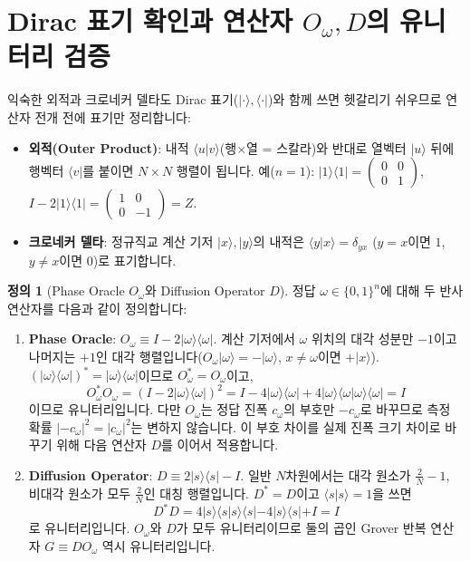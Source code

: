 \documentclass[11pt, a4paper]{article}
\newcommand{\ket}[1]{|#1\rangle}
\newcommand{\bra}[1]{\langle#1|}
\newcommand{\braket}[2]{\langle#1|#2\rangle}
\theoremstyle{definition}
\newtheorem{definition}{정의}[section]
\begin{document}
\section{Dirac 표기 확인과 연산자 \texorpdfstring{$O_\omega, D$}{O, D}의 유니터리 검증}
익숙한 외적과 크로네커 델타도 Dirac 표기($\ket{\cdot}, \bra{\cdot}$)와 함께 쓰면 헷갈리기 쉬우므로 연산자 전개 전에 표기만 정리합니다:
\begin{itemize}
    \item \textbf{외적(Outer Product)}: 내적 $\braket{u}{v}$(행$\times$열 = 스칼라)와 반대로 열벡터 $\ket{u}$ 뒤에 행벡터 $\bra{v}$를 붙이면 $N\times N$ 행렬이 됩니다. 예($n=1$): $\ket{1}\bra{1} = \begin{pmatrix} 0 & 0 \\ 0 & 1 \end{pmatrix}$, $I - 2\ket{1}\bra{1} = \begin{pmatrix} 1 & 0 \\ 0 & -1 \end{pmatrix} = Z$.
    \item \textbf{크로네커 델타}: 정규직교 계산 기저 $\ket{x}, \ket{y}$의 내적은 $\braket{y}{x} = \delta_{yx}$ ($y=x$이면 $1$, $y\neq x$이면 $0$)로 표기합니다.
\end{itemize}

\begin{definition}[Phase Oracle $O_\omega$와 Diffusion Operator $D$]
정답 $\omega \in \{0,1\}^n$에 대해 두 반사 연산자를 다음과 같이 정의합니다:
\begin{enumerate}
    \item \textbf{Phase Oracle}: $O_\omega \equiv I - 2\ket{\omega}\bra{\omega}$. 계산 기저에서 $\omega$ 위치의 대각 성분만 $-1$이고 나머지는 $+1$인 대각 행렬입니다($O_\omega\ket{\omega} = -\ket{\omega}$, $x\neq\omega$이면 $+\ket{x}$). $(\ket{\omega}\bra{\omega})^* = \ket{\omega}\bra{\omega}$이므로 $O_\omega^* = O_\omega$이고,
    $$O_\omega^* O_\omega = (I - 2\ket{\omega}\bra{\omega})^2 = I - 4\ket{\omega}\bra{\omega} + 4\ket{\omega}\braket{\omega}{\omega}\bra{\omega} = I$$
    이므로 유니터리입니다. 다만 $O_\omega$는 정답 진폭 $c_\omega$의 부호만 $-c_\omega$로 바꾸므로 측정 확률 $|-c_\omega|^2 = |c_\omega|^2$는 변하지 않습니다. 이 부호 차이를 실제 진폭 크기 차이로 바꾸기 위해 다음 연산자 $D$를 이어서 적용합니다.
    \item \textbf{Diffusion Operator}: $D \equiv 2\ket{s}\bra{s} - I$. 일반 $N$차원에서는 대각 원소가 $\frac{2}{N}-1$, 비대각 원소가 모두 $\frac{2}{N}$인 대칭 행렬입니다. $D^* = D$이고 $\braket{s}{s}=1$을 쓰면
    $$D^* D = 4\ket{s}\braket{s}{s}\bra{s} - 4\ket{s}\bra{s} + I = I$$
    로 유니터리입니다. $O_\omega$와 $D$가 모두 유니터리이므로 둘의 곱인 Grover 반복 연산자 $G \equiv D O_\omega$ 역시 유니터리입니다.
\end{enumerate}
\end{definition}
\end{document}
